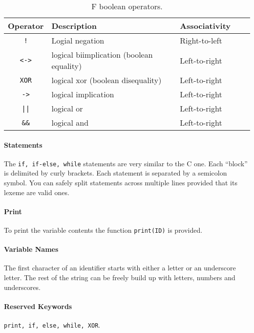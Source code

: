 \begin{table}[h]
\centering

\begin{tabular}{|c|l|l|l|l|}
\hline
\textbf{Operator} & \textbf{Description} & \textbf{Associativity} \\ 
\hline
\verb|!|	& Logial negation	& Right-to-left	\\
\verb|<->| & logical biimplication (boolean equality) & Left-to-right \\ 
\verb|XOR| & logical xor (boolean disequality) & Left-to-right \\ 
\verb|->|  & logical implication & Left-to-right \\ 
\verb!||!  & logical or & Left-to-right\\ 
\verb|&&|	& logical and & Left-to-right\\ 
\hline
\end{tabular}
\caption{F boolean operators.}
\label{table:f:bool:operators}
\end{table}

\paragraph{Statements}
The \verb|if, if-else, while| statements are very similar to the C one. Each
``block'' is delimited by curly brackets. Each statement is separated by a 
semicolon symbol. You can safely split statements across multiple lines 
provided that its lexeme are valid ones.

\paragraph{Print} To print the variable contents the function \verb|print(ID)|
is provided.

\paragraph{Variable Names} The first character of an identifier starts with
either a letter or an underscore letter. The rest of the string can be freely
build up with letters, numbers and underscores.

\paragraph{Reserved Keywords}
\verb|print, if, else, while, XOR|.




